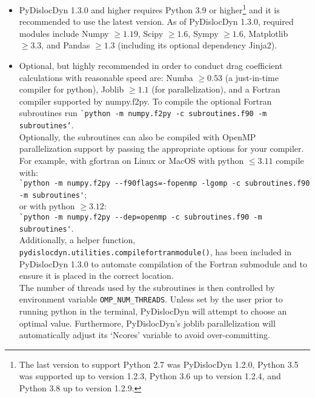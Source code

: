 \documentclass[11pt,letterpaper,oneside,pdftex]{article}
\begin{document}
\begin{itemize}
\item PyDislocDyn 1.3.0 and higher requires Python 3.9 or higher\footnote{
The last version to support Python 2.7 was PyDislocDyn 1.2.0, Python 3.5 was supported up to version 1.2.3, Python 3.6 up to version 1.2.4, and Python 3.8 up to version 1.2.9.}
and it is recommended to use the latest version.
As of PyDislocDyn 1.3.0, required modules include Numpy $\ge1.19$, Scipy $\ge1.6$, Sympy $\ge1.6$, Matplotlib $\ge3.3$, and Pandas $\ge1.3$ (including its optional dependency Jinja2).
\item Optional, but highly recommended in order to conduct drag coefficient calculations with reasonable speed are:
Numba $\ge0.53$ (a just-in-time compiler for python), Joblib $\ge1.1$ (for parallelization), and a Fortran compiler supported by numpy.f2py. To compile the optional Fortran subroutines run \verb|`python -m numpy.f2py -c subroutines.f90 -m subroutines’|.\\
Optionally, the subroutines can also be compiled with OpenMP parallelization support by passing the appropriate options for your compiler. For example, with gfortran on Linux or MacOS with python $\leq3.11$ compile with:
\\\verb|`python -m numpy.f2py --f90flags=-fopenmp -lgomp -c subroutines.f90|\\\verb|-m subroutines'|;\\
or with python $\geq3.12$:
\\\verb|`python -m numpy.f2py --dep=openmp -c subroutines.f90 -m subroutines'|.\\
Additionally, a helper function, \verb|pydislocdyn.utilities.compilefortranmodule()|, has been included in PyDislocDyn 1.3.0 to automate compilation of the Fortran submodule and to ensure it is placed in the correct location.\\
The number of threads used by the subroutines is then controlled by environment variable \verb|OMP_NUM_THREADS|.
Unless set by the user prior to running python in the terminal, PyDislocDyn will attempt to choose an optimal value.
Furthermore, PyDislocDyn’s joblib parallelization will automatically adjust its ‘Ncores’ variable to avoid over-committing.
\end{itemize}
\end{document}
